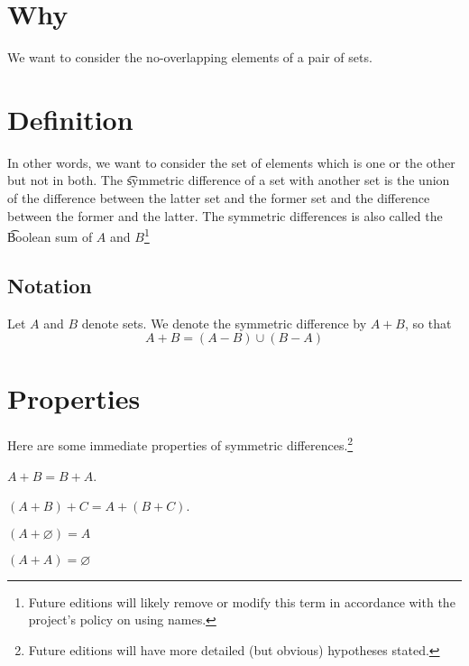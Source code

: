 

\section*{Why}

We want to consider the no-overlapping elements of a pair of sets.

\section*{Definition}

In other words, we want to consider the set of elements which is one or the other but not in both.
The \t{symmetric difference} of a set with another set is the union of the difference between the latter set and the former set and the difference between the former and the latter.
The symmetric differences is also called the \t{Boolean sum} of $A$ and $B$\footnote{Future editions will likely remove or modify this term in accordance with the project's policy on using names.}

\subsection*{Notation}

Let $A$ and $B$ denote sets.
We denote the symmetric difference by $A + B$, so that
    \[
A + B = (A - B) \cup (B - A)
    \]

\section*{Properties}

Here are some immediate properties of symmetric differences.\footnote{Future editions will have more detailed (but obvious) hypotheses stated.}

\begin{proposition}[Commutative]
$A + B = B + A$.\end{proposition}
\begin{proposition}[Associative]
$(A + B) + C = A + (B + C)$.\end{proposition}
\begin{proposition}[Identity]
$(A + \varnothing) = A$\end{proposition}
\begin{proposition}[Inverse]
$(A + A) = \varnothing$\end{proposition}
\blankpage